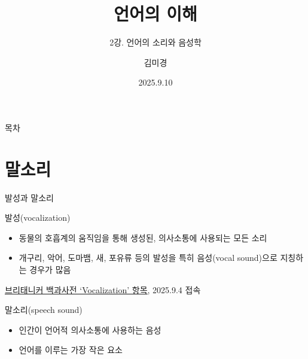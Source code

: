 \documentclass[11pt, aspectratio=169]{beamer}
\title{언어의 이해}
\subtitle{2강. 언어의 소리와 음성학}
\author{김미경}
\date{2025.9.10}
\begin{document}
\frame{\titlepage}

\begin{frame}[t]{목차}
\tableofcontents
\end{frame}

\section{말소리}

\begin{frame}[t]{발성과 말소리}
  \begin{block}{발성(vocalization)}
    \begin{itemize}
        \item 동물의 호흡계의 움직임을 통해 생성된, 의사소통에 사용되는 모든 소리
        \item 개구리, 악어, 도마뱀, 새, 포유류 등의 발성을 특히 음성(vocal sound)으로 지칭하는 경우가 많음
    \end{itemize}
  \end{block}
  \begin{flushright}
    \href{https://www.britannica.com/science/vocalization}{\underline{브리태니커 백과사전 ‘Vocalization’ 항목}}, 2025.9.4 접속
  \end{flushright}
  \begin{block}{말소리(speech sound)}
    \begin{itemize}
        \item 인간이 언어적 의사소통에 사용하는 음성
        \item 언어를 이루는 가장 작은 요소
    \end{itemize}
  \end{block}
\end{frame}
\end{document}
